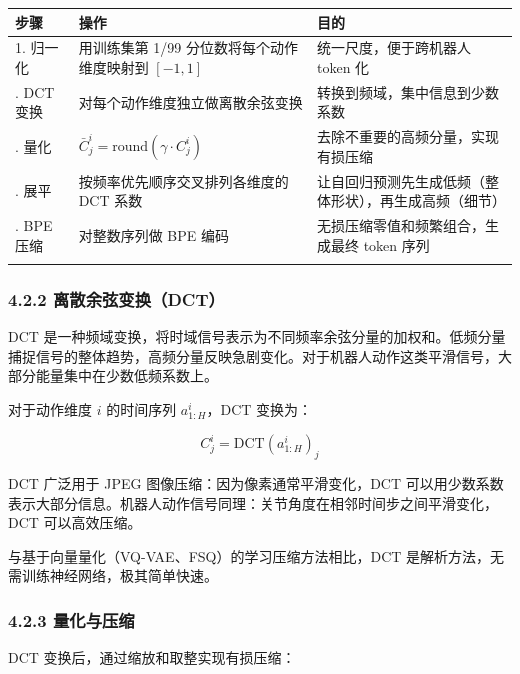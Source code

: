 \documentclass[
  chinese,
]{ctexart}
\begin{document}
\begin{center}
\begin{tabular}{@{}>{\raggedright\arraybackslash}p{} >{\raggedright\arraybackslash}p{} >{\raggedright\arraybackslash}p{}@{}}
\toprule\noalign{}
步骤 & 操作 & 目的 \\
\midrule\noalign{}
1. 归一化 & 用训练集第 1/99 分位数将每个动作维度映射到 \([-1, 1]\) & 统一尺度，便于跨机器人 token 化 \\
2. DCT 变换 & 对每个动作维度独立做离散余弦变换 & 转换到频域，集中信息到少数系数 \\
3. 量化 & \(\bar{C}^i_j = \text{round}(\gamma \cdot C^i_j)\) & 去除不重要的高频分量，实现有损压缩 \\
4. 展平 & 按频率优先顺序交叉排列各维度的 DCT 系数 & 让自回归预测先生成低频（整体形状），再生成高频（细节） \\
5. BPE 压缩 & 对整数序列做 BPE 编码 & 无损压缩零值和频繁组合，生成最终 token 序列 \\
\bottomrule\noalign{}
\end{tabular}
\end{center}

\subsubsection{4.2.2
离散余弦变换（DCT）}\label{ux79bbux6563ux4f59ux5f26ux53d8ux6362dct}

DCT
是一种频域变换，将时域信号表示为不同频率余弦分量的加权和。低频分量捕捉信号的整体趋势，高频分量反映急剧变化。对于机器人动作这类平滑信号，大部分能量集中在少数低频系数上。

对于动作维度 \(i\) 的时间序列 \(a^i_{1:H}\)，DCT 变换为：

\[
C^i_j = \text{DCT}(a^i_{1:H})_j
\]

DCT 广泛用于 JPEG 图像压缩：因为像素通常平滑变化，DCT
可以用少数系数表示大部分信息。机器人动作信号同理：关节角度在相邻时间步之间平滑变化，DCT
可以高效压缩。

与基于向量量化（VQ-VAE、FSQ）的学习压缩方法相比，DCT
是解析方法，无需训练神经网络，极其简单快速。

\subsubsection{4.2.3 量化与压缩}\label{ux91cfux5316ux4e0eux538bux7f29}

DCT 变换后，通过缩放和取整实现有损压缩：
\end{document}
